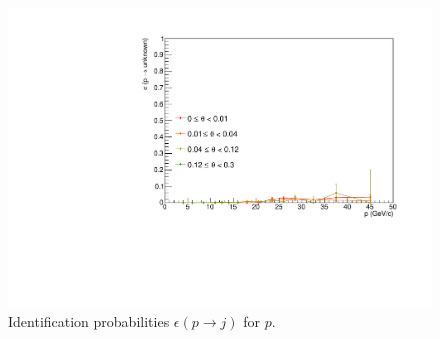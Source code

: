 \begin{figure}[!p]
  \includegraphics[scale=0.38]{./gfx/pp_u.pdf}
	\caption{Identification probabilities $\epsilon(p \rightarrow j)$ for $p$.}
	\label{pic:Effpp}
\end{figure}


